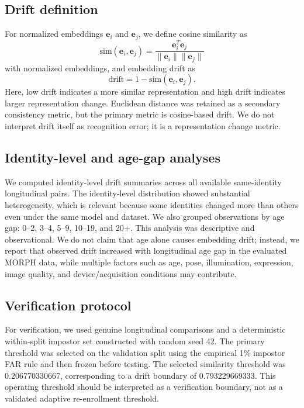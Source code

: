 \documentclass[conference]{IEEEtran}
\begin{document}
\subsection{Drift definition}
For normalized embeddings $\mathbf{e}_i$ and $\mathbf{e}_j$, we define cosine similarity as
\begin{equation}
\text{sim}(\mathbf{e}_i, \mathbf{e}_j) = \frac{\mathbf{e}_i^T \mathbf{e}_j}{\lVert \mathbf{e}_i \rVert \lVert \mathbf{e}_j \rVert}
\end{equation}
with normalized embeddings, and embedding drift as
\begin{equation}
\text{drift} = 1 - \text{sim}(\mathbf{e}_i, \mathbf{e}_j).
\end{equation}
Here, low drift indicates a more similar representation and high drift indicates larger representation change. Euclidean distance was retained as a secondary consistency metric, but the primary metric is cosine-based drift. We do not interpret drift itself as recognition error; it is a representation change metric.

\subsection{Identity-level and age-gap analyses}
We computed identity-level drift summaries across all available same-identity longitudinal pairs. The identity-level distribution showed substantial heterogeneity, which is relevant because some identities changed more than others even under the same model and dataset. We also grouped observations by age gap: 0--2, 3--4, 5--9, 10--19, and 20+. This analysis was descriptive and observational. We do not claim that age alone causes embedding drift; instead, we report that observed drift increased with longitudinal age gap in the evaluated MORPH data, while multiple factors such as age, pose, illumination, expression, image quality, and device/acquisition conditions may contribute.

\subsection{Verification protocol}
For verification, we used genuine longitudinal comparisons and a deterministic within-split impostor set constructed with random seed 42. The primary threshold was selected on the validation split using the empirical 1\% impostor FAR rule and then frozen before testing. The selected similarity threshold was 0.206770330667, corresponding to a drift boundary of 0.793229669333. This operating threshold should be interpreted as a verification boundary, not as a validated adaptive re-enrollment threshold.
\end{document}

